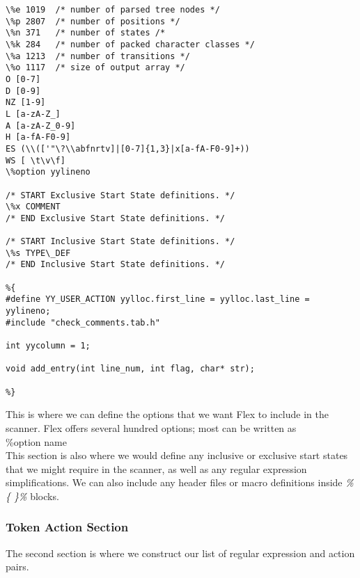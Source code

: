 \begingroup
    \fontsize{8pt}{8pt}\selectfont
\begin{verbatim}
\%e 1019  /* number of parsed tree nodes */
\%p 2807  /* number of positions */
\%n 371   /* number of states /*
\%k 284   /* number of packed character classes */
\%a 1213  /* number of transitions */
\%o 1117  /* size of output array */
O [0-7]
D [0-9]
NZ [1-9]
L [a-zA-Z_]
A [a-zA-Z_0-9]
H [a-fA-F0-9]
ES (\\(['"\?\\abfnrtv]|[0-7]{1,3}|x[a-fA-F0-9]+))
WS [ \t\v\f]
\%option yylineno

/* START Exclusive Start State definitions. */
\%x COMMENT
/* END Exclusive Start State definitions. */

/* START Inclusive Start State definitions. */
\%s TYPE\_DEF
/* END Inclusive Start State definitions. */

%{
#define YY_USER_ACTION yylloc.first_line = yylloc.last_line = yylineno;
#include "check_comments.tab.h"

int yycolumn = 1;

void add_entry(int line_num, int flag, char* str);

%}

\end{verbatim}
\endgroup

\noindent This is where we can define the options that we want Flex to include 
in the scanner. Flex offers several hundred options; most can be written as\\
\%option name \\
This section is also where we would define any inclusive or exclusive start
states that we might require in the scanner, as well as any regular expression
simplifications. We can also include any 
header files or macro definitions inside \emph{\%\{ \}\%} blocks.


\subsubsection{Token Action Section} 
\noindent The second section is where we construct our list of regular expression and 
action pairs.

\begingroup

